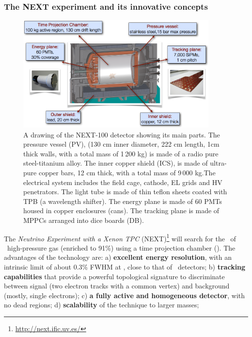 \documentclass[a4paper,11pt,oneside]{article}
\begin{document}
\subsubsection*{The NEXT experiment and its innovative concepts}
\begin{figure}
\centering
\includegraphics[width=0.9\textwidth]{img/NEXT.png}
\caption{\small A drawing of the NEXT-100 detector showing its main parts.  The pressure vessel (PV),  (130 cm inner diameter, 222 cm length, 1cm thick walls, with a total mass of 1\,200 kg) is made of a radio pure steel-titanium alloy.
The inner copper shield (ICS), is made of ultra-pure copper bars, 12 cm thick, with a total mass of 9\,000 kg.The electrical system includes the field cage, cathode, EL grids and HV penetrators.
The light tube is made of thin teflon sheets coated with TPB (a wavelength shifter). 
The energy plane is made of 60 PMTs housed in copper enclosures (cans).
The tracking plane is made of MPPCs arranged into dice boards (DB). 
}
\label{fig.NEXT100}
\end{figure}

The \emph{Neutrino Experiment with a Xenon TPC} (NEXT)\footnote{\href{http://next.ific.uv.es/}{http://next.ific.uv.es/}} will search for the \bbonu\ of \XE\ high-pressure gas (enriched to 91\%) using a time projection chamber (\HPXE). The advantages of the technology are: 
a) {\bf excellent energy resolution}, with an intrinsic limit of about 0.3\% FWHM at \Qbb, close to that of \GE\ detectors; b)
{\bf tracking capabilities} that provide a powerful topological signature to discriminate between signal (two electron tracks with a common vertex) and background (mostly, single electrons); c)
{\bf a fully active and homogeneous detector}, with no dead regions; d) {\bf scalability} of the technique to larger masses; %
\end{document}
